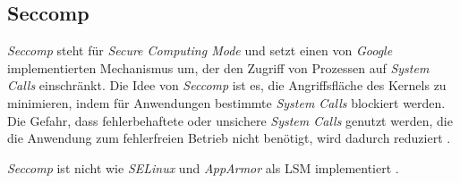 \documentclass[../main.tex]{subfiles}
\begin{document}




    \subsection{Seccomp}
		\label{seccomp}


			\emph{Seccomp} steht für \emph{Secure Computing Mode} und setzt einen von \emph{Google} implementierten Mechanismus um, der den Zugriff von Prozessen auf \emph{System Calls} einschränkt. Die Idee von \emph{Seccomp} ist es, die Angriffsfläche des Kernels zu minimieren, indem für Anwendungen bestimmte \emph{System Calls}  blockiert werden. Die Gefahr, dass fehlerbehaftete oder unsichere \emph{System Calls} genutzt werden, die die Anwendung zum fehlerfreien Betrieb nicht benötigt, wird dadurch reduziert \cite{linuxSecOverview}\cite{seccompGitDesc}\cite{secInFuture}.

			\emph{Seccomp} ist nicht wie \emph{SELinux} und \emph{AppArmor} als LSM implementiert \cite{seccompLWN}.
\end{document}
